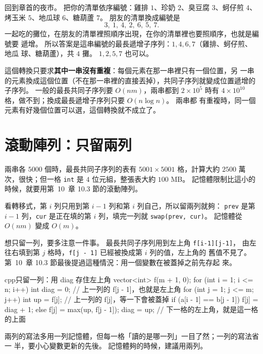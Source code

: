 回到章首的夜市。 把你的清單依序編號：雞排 $1$、珍奶 $2$、臭豆腐 $3$、蚵仔煎
$4$、烤玉米 $5$、地瓜球 $6$、糖葫蘆 $7$。 朋友的清單換成編號是
\[
3,\ 1,\ 4,\ 2,\ 6,\ 5,\ 7.
\]
一起吃的攤位，在朋友的清單裡照順序出現，在你的清單裡也要照順序，也就是編號要
遞增。 所以答案是這串編號的最長遞增子序列：$1, 4, 6, 7$（雞排、蚵仔煎、地瓜
球、糖葫蘆），共 $4$ 攤。 $1, 2, 5, 7$ 也可以。

這個轉換只要求\textbf{其中一串沒有重複}：每個元素在那一串裡只有一個位置，另
一串的元素換成這個位置（不在那一串裡的直接丟掉），共同子序列就變成位置遞增的
子序列。 一般的最長共同子序列要 $O(nm)$，兩串都到 $2 \times 10^5$ 時有
$4 \times 10^{10}$ 格，做不到；換成最長遞增子序列只要 $O(n \log n)$。 兩串都
有重複時，同一個元素有好幾個位置可以選，這個轉換就不成立了。

\section{滾動陣列：只留兩列}
\label{sec:ss-rolling}

兩串各 $5000$ 個時，最長共同子序列的表有 $5001 \times 5001$ 格，計算大約
$2500$ 萬次，很快；但一格 \texttt{int} 是 $4$ 位元組，整張表大約 $100$ MB。
記憶體限制比這小的時候，就要用第~10~章 10.3 節的滾動陣列。

看轉移式，第 $i$ 列只用到第 $i - 1$ 列和第 $i$ 列自己，所以留兩列就夠：
\texttt{prev} 是第 $i - 1$ 列，\texttt{cur} 是正在填的第 $i$ 列，填完一列就
\texttt{swap(prev, cur)}。 記憶體從 $O(nm)$ 變成 $O(m)$。

想只留一列，要多注意一件事。 最長共同子序列用到左上角 \texttt{f[i-1][j-1]}，
由左往右填到第 $j$ 格時，\texttt{f[j - 1]} 已經被換成第 $i$ 列的值，左上角的
舊值不見了。 第~10~章 10.3 節最後提過這種情況：用一個變數在被蓋掉之前先存起
來。

\begin{code}{cpp}{只留一列：用 diag 存住左上角}
vector<int> f(m + 1, 0);
for (int i = 1; i <= n; i++) {
    int diag = 0;                 // 上一列的 f[j - 1]，也就是左上角
    for (int j = 1; j <= m; j++) {
        int up = f[j];            // 上一列的 f[j]，等一下會被蓋掉
        if (a[i - 1] == b[j - 1]) {
            f[j] = diag + 1;
        } else {
            f[j] = max(up, f[j - 1]);
        }
        diag = up;                // 下一格的左上角，就是這一格的上面
    }
}
\end{code}

兩列的寫法多用一列記憶體，但每一格「讀的是哪一列」一目了然；一列的寫法省一
半，要小心變數更新的先後。 記憶體夠的時候，建議用兩列。

